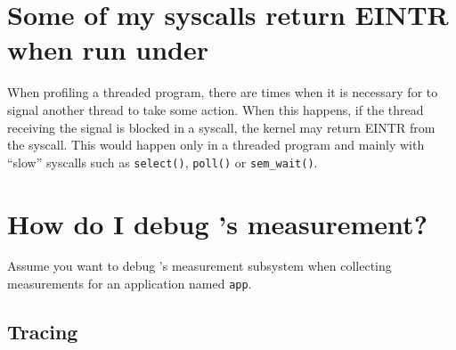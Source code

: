 \documentclass[11pt,letterpaper]{report}
\begin{document}

\section{Some of my syscalls return EINTR when run under \hpcrun{}}

When profiling a threaded program, there are times when it is
necessary for \hpcrun{} to signal another thread to take some action.
When this happens, if the thread receiving the signal is blocked in a
syscall, the kernel may return EINTR from the syscall.  This would
happen only in a threaded program and mainly with ``slow'' syscalls
such as {\tt select()}, {\tt poll()} or {\tt sem\_wait()}.



\section{How do I debug \HPCToolkit{}'s measurement?}

Assume you want to debug \HPCToolkit{}'s measurement subsystem when 
collecting measurements for an application named \texttt{app}.


\subsection{Tracing \libmonitor{}}
\end{document}
